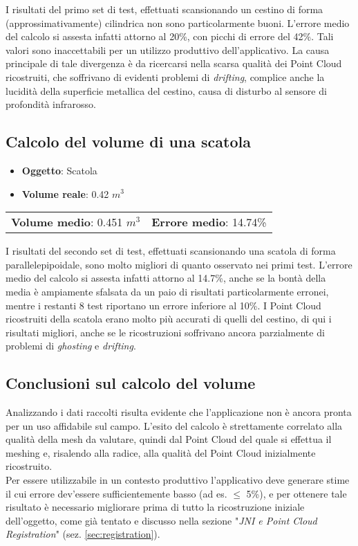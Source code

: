 \noindent
I risultati del primo set di test, effettuati scansionando un cestino di forma (approssimativamente) cilindrica non sono particolarmente buoni. L'errore medio del calcolo si assesta infatti attorno al 20\%, con picchi di errore del 42\%. Tali valori sono inaccettabili per un utilizzo produttivo dell'applicativo. La causa principale di tale divergenza è da ricercarsi nella scarsa qualità dei Point Cloud ricostruiti, che soffrivano di evidenti problemi di \emph{drifting}, complice anche la lucidità della superficie metallica del cestino, causa di disturbo al sensore di profondità infrarosso.

\subsection{Calcolo del volume di una scatola}
\begin{itemize}
\item \textbf{Oggetto}: Scatola 
\item \textbf{Volume reale}: 0.42 $ m^3 $
\end{itemize}
\noindent
\begin{tabular}{l r}
\textbf{Volume medio}: 0.451 $m^3$ & \hspace{115pt} \textbf{Errore medio}: 14.74\% \\
\end{tabular}
I risultati del secondo set di test, effettuati scansionando una scatola di forma parallelepipoidale, sono molto migliori di quanto osservato nei primi test.
L'errore medio del calcolo si assesta infatti attorno al 14.7\%, anche se la bontà della media è ampiamente sfalsata da un paio di risultati particolarmente erronei, mentre i restanti 8 test riportano un errore inferiore al 10\%.
I Point Cloud ricostruiti della scatola erano molto più accurati di quelli del cestino, di qui i risultati migliori, anche se le ricostruzioni soffrivano ancora parzialmente di problemi di \emph{ghosting} e \emph{drifting}.

\subsection{Conclusioni sul calcolo del volume}
Analizzando i dati raccolti risulta evidente che l'applicazione non è ancora pronta per un uso affidabile sul campo. L'esito del calcolo è strettamente correlato alla qualità della mesh da valutare, quindi dal Point Cloud del quale si effettua il meshing e, risalendo alla radice, alla qualità del Point Cloud inizialmente ricostruito.\\
Per essere utilizzabile in un contesto produttivo l'applicativo deve generare stime il cui errore dev'essere sufficientemente basso (ad es. $\leq$ 5\%), e per ottenere tale risultato è necessario migliorare prima di tutto la ricostruzione iniziale dell'oggetto, come già tentato e discusso nella sezione "\emph{JNI e Point Cloud Registration}" (sez. \ref{sec:registration}).


